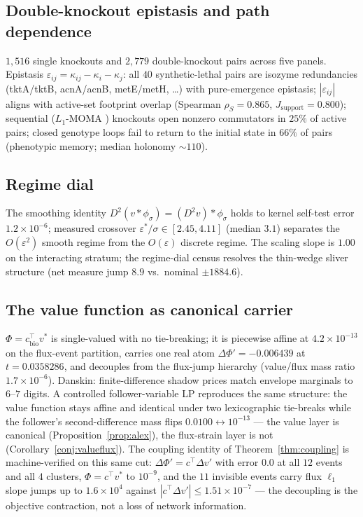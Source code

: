 \documentclass[11pt,a4paper]{article}
\theoremstyle{plain}
\theoremstyle{definition}
\theoremstyle{remark}
\begin{document}
\subsection{Double-knockout epistasis and path dependence}
$1{,}516$ single knockouts and $2{,}779$ double-knockout pairs across five
panels. Epistasis $\varepsilon_{ij} = \kappa_{ij} - \kappa_i - \kappa_j$:
all $40$ synthetic-lethal pairs are isozyme redundancies
(tktA/tktB, acnA/acnB, metE/metH, \dots) with pure-emergence epistasis;
$|\varepsilon_{ij}|$ aligns with active-set footprint overlap
(Spearman $\rho_S = 0.865$, $J_{\mathrm{support}} = 0.800$); sequential
($L_1$-MOMA \citep{segre2002}) knockouts open nonzero commutators in $25\%$ of active pairs;
closed genotype loops fail to return to the initial state in $66\%$ of
pairs (phenotypic memory; median holonomy $\sim 110$).

\subsection{Regime dial}
\label{sec:m4}
The smoothing identity $D^2(v * \phi_\sigma) = (D^2 v) * \phi_\sigma$
holds to kernel self-test error $1.2 \times 10^{-6}$; measured crossover
$\varepsilon^*/\sigma \in [2.45, 4.11]$ (median $3.1$) separates the
$O(\varepsilon^2)$ smooth regime from the $O(\varepsilon)$ discrete
regime. The scaling slope is $1.00$ on the interacting stratum; the regime-dial census resolves the thin-wedge sliver structure
(net measure jump $8.9$ vs.\ nominal $\pm 1884.6$).

\subsection{The value function as canonical carrier}
\label{sec:v1}
$\Phi = c_{\mathrm{bio}}^\top v^*$ is single-valued with no tie-breaking;
it is piecewise affine at $4.2 \times 10^{-13}$ on the flux-event
partition, carries one real atom
$\Delta\Phi' = -0.006439$ at $t = 0.0358286$, and decouples from the
flux-jump hierarchy (value/flux mass ratio $1.7 \times 10^{-6}$).
Danskin: finite-difference shadow prices match envelope marginals to
$6$--$7$ digits. A controlled follower-variable LP reproduces the same
structure: the value function stays affine and identical under two
lexicographic tie-breaks while the follower's second-difference mass
flips $0.0100 \leftrightarrow 10^{-13}$ --- the value layer is
canonical (Proposition~\ref{prop:alex}), the flux-strain layer is not
(Corollary~\ref{conj:valueflux}). The coupling identity of
Theorem~\ref{thm:coupling} is machine-verified on this same cut:
$\Delta\Phi' = c^\top \Delta v'$ with error $0.0$ at all $12$
events and all $4$ clusters, $\Phi = c^\top v^*$ to $10^{-9}$, and
the $11$ invisible events carry flux $\ell_1$ slope jumps up to
$1.6 \times 10^{4}$ against $|c^\top \Delta v'| \le 1.51 \times
10^{-7}$ --- the decoupling is the objective contraction, not a loss
of network information.
\end{document}
